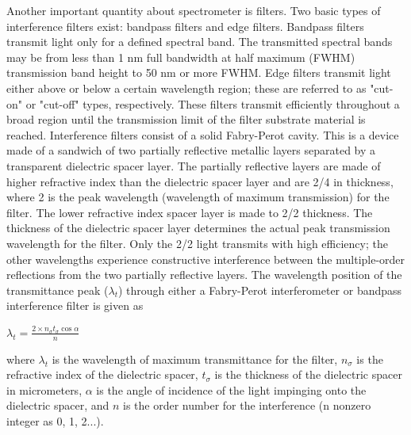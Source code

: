 \documentclass[a4paper,12pt]{report}
\begin{document}
Another important quantity about spectrometer is filters. Two basic types of interference filters exist: bandpass filters and edge filters.
Bandpass filters transmit light only for a defined spectral band. The transmitted
spectral bands may be from less than 1 nm full bandwidth at half
maximum (FWHM) transmission band height to 50 nm or more FWHM.
Edge filters transmit light either above or below a certain wavelength
region; these are referred to as "cut-on" or "cut-off" types, respectively.
These filters transmit efficiently throughout a broad region until the transmission
limit of the filter substrate material is reached.
Interference filters consist of a solid Fabry-Perot cavity. This is a device
made of a sandwich of two partially reflective metallic layers separated by a
transparent dielectric spacer layer. The partially reflective layers are made
of higher refractive index than the dielectric spacer layer and are 2/4 in
thickness, where 2 is the peak wavelength (wavelength of maximum
transmission) for the filter. The lower refractive index spacer layer is made
to 2/2 thickness. The thickness of the dielectric spacer layer determines the
actual peak transmission wavelength for the filter. Only the 2/2 light transmits
with high efficiency; the other wavelengths experience constructive
interference between the multiple-order reflections from the two partially
reflective layers. The wavelength position of the transmittance peak ($\lambda_{t}$) through either a
Fabry-Perot interferometer or bandpass interference filter is given as
\begin{center}
	{\Large $\lambda_{t}=\frac{2\times n_{\sigma}t_{\sigma}\cos\alpha}{n}$}
\end{center}
where $\lambda_{t}$ is the wavelength of maximum transmittance for the filter, $n_{\sigma}$ is the refractive index of the dielectric spacer, $t_{\sigma}$ is the thickness of the dielectric
spacer in micrometers, $\alpha$ is the angle of incidence of the light impinging
onto the dielectric spacer, and $n$ is the order number for the interference (n
nonzero integer as 0, 1, 2...).
\end{document}
